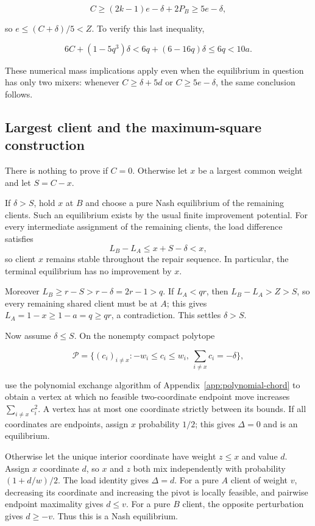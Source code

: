 \documentclass[11pt]{amsart}
\numberwithin{equation}{section}
\theoremstyle{definition}
\begin{document}
\[
C\ge(2k-1)e-\delta+2P_B\ge5e-\delta,
\]

so \(e\le(C+\delta)/5<Z\). To verify this last inequality,

\[
6C+(1-5q^3)\delta<6q+(6-16q)\delta\le6q<10a.
\]

These numerical mass implications apply even when the equilibrium in question has only two mixers: whenever \(C\ge\delta+5d\) or \(C\ge5e-\delta\), the same conclusion follows.


\subsection{Largest client and the maximum-square construction}\label{largest-client-and-the-maximum-square-construction}

There is nothing to prove if \(C=0\). Otherwise let \(x\) be a largest common weight and let \(S=C-x\).

If \(\delta>S\), hold \(x\) at \(B\) and choose a pure Nash equilibrium of the remaining clients. Such an equilibrium exists by the usual finite improvement potential. For every intermediate assignment of the remaining clients, the load difference satisfies
\[
L_B-L_A\le x+S-\delta<x,
\]
so client \(x\) remains stable throughout the repair sequence. In particular, the terminal equilibrium has no improvement by \(x\).

Moreover \(L_B\ge r-S>r-\delta=2r-1>q\). If \(L_A<qr\), then \(L_B-L_A>Z>S\), so every remaining shared client must be at \(A\); this gives \(L_A=1-x\ge1-a=q\ge qr\), a contradiction. This settles \(\delta>S\).

Now assume \(\delta\le S\). On the nonempty compact polytope

\[
\mathcal P=\{(c_i)_{i\ne x}: -w_i\le c_i\le w_i,\ \sum_{i\ne x}c_i=-\delta\},
\]

use the polynomial exchange algorithm of Appendix~\ref{app:polynomial-chord} to obtain a vertex at which no feasible two-coordinate endpoint move increases \(\sum_{i\ne x}c_i^2\). A vertex has at most one coordinate strictly between its bounds. If all coordinates are endpoints, assign \(x\) probability \(1/2\); this gives \(\Delta=0\) and is an equilibrium.

Otherwise let the unique interior coordinate have weight \(z\le x\) and value \(d\). Assign \(x\) coordinate \(d\), so \(x\) and \(z\) both mix independently with probability \((1+d/w)/2\). The load identity gives \(\Delta=d\). For a pure \(A\) client of weight \(v\), decreasing its coordinate and increasing the pivot is locally feasible, and pairwise endpoint maximality gives \(d\le v\). For a pure \(B\) client, the opposite perturbation gives \(d\ge-v\). Thus this is a Nash equilibrium.
\end{document}
